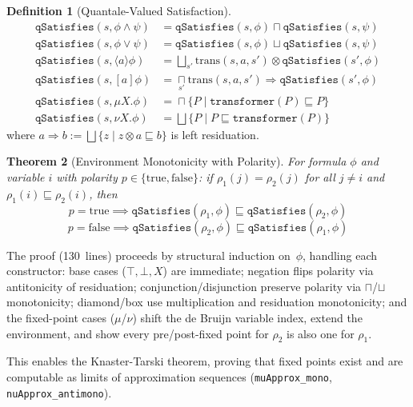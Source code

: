 \documentclass[11pt]{article}
\newtheorem{theorem}{Theorem}[section]
\theoremstyle{definition}
\newtheorem{definition}[theorem]{Definition}
\theoremstyle{remark}
\providecommand{\bigsqcap}{\mathop{\textstyle\sqcap}\limits}
\begin{document}
\begin{definition}[Quantale-Valued Satisfaction]
\begin{align*}
\texttt{qSatisfies}(s, \phi \land \psi) &= \texttt{qSatisfies}(s, \phi) \sqcap \texttt{qSatisfies}(s, \psi) \\
\texttt{qSatisfies}(s, \phi \lor \psi) &= \texttt{qSatisfies}(s, \phi) \sqcup \texttt{qSatisfies}(s, \psi) \\
\texttt{qSatisfies}(s, \langle a \rangle \phi) &= \bigsqcup_{s'} \mathrm{trans}(s, a, s') \otimes \texttt{qSatisfies}(s', \phi) \\
\texttt{qSatisfies}(s, [a] \phi) &= \bigsqcap_{s'} \mathrm{trans}(s, a, s') \Rightarrow \texttt{qSatisfies}(s', \phi) \\
\texttt{qSatisfies}(s, \mu X.\phi) &= \bigsqcap \{P \mid \texttt{transformer}(P) \sqsubseteq P\} \\
\texttt{qSatisfies}(s, \nu X.\phi) &= \bigsqcup \{P \mid P \sqsubseteq \texttt{transformer}(P)\}
\end{align*}
where $a \Rightarrow b := \bigsqcup\{z \mid z \otimes a \sqsubseteq b\}$
is left residuation.
\end{definition}

\begin{theorem}[Environment Monotonicity with Polarity]
\label{thm:env-mono}
For formula $\phi$ and variable $i$ with polarity
$p \in \{\mathrm{true}, \mathrm{false}\}$:
if $\rho_1(j) = \rho_2(j)$ for all $j \neq i$ and
$\rho_1(i) \sqsubseteq \rho_2(i)$, then
\[
  p = \mathrm{true} \implies \texttt{qSatisfies}(\rho_1, \phi)
    \sqsubseteq \texttt{qSatisfies}(\rho_2, \phi)
\]
\[
  p = \mathrm{false} \implies \texttt{qSatisfies}(\rho_2, \phi)
    \sqsubseteq \texttt{qSatisfies}(\rho_1, \phi)
\]
\end{theorem}

\noindent
The proof (130~lines) proceeds by structural induction on~$\phi$,
handling each constructor: base cases ($\top, \bot, X$) are immediate;
negation flips polarity via antitonicity of residuation;
conjunction/disjunction preserve polarity via $\sqcap$/$\sqcup$
monotonicity; diamond/box use multiplication and residuation
monotonicity; and the fixed-point cases ($\mu$/$\nu$) shift the de
Bruijn variable index, extend the environment, and show every
pre/post-fixed point for $\rho_2$ is also one for $\rho_1$.

This enables the Knaster-Tarski theorem, proving that fixed points
exist and are computable as limits of approximation sequences
(\texttt{muApprox\_mono}, \texttt{nuApprox\_antimono}).
\end{document}
